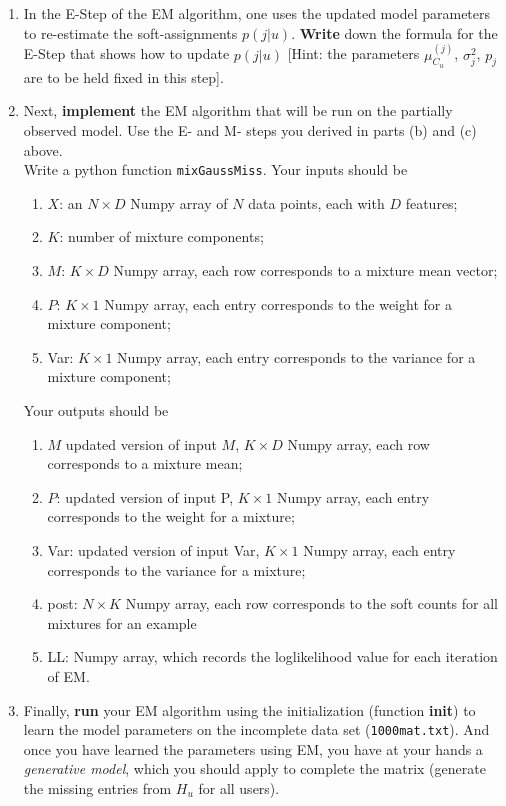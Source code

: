 \begin{enumerate}
\begin{enumerate}
\begin{enumerate}

\end{enumerate}

\item In the E-Step of the EM algorithm, one uses the updated model parameters to re-estimate  the soft-assignments $p(j|u)$. \textbf{Write} down the formula for the E-Step that shows how to update $p(j|u)$ [Hint: the parameters $\mu^{(j)}_{C_u}$, $\sigma^2_j$, $p_j$ are to be held fixed in this step].

\item Next, \textbf{implement} the EM algorithm that will be run on the partially observed model. Use the E- and M- steps you derived in parts (b) and (c) above.\\
    Write a python function \texttt{mixGaussMiss}. Your inputs should be
    \begin{enumerate}
    \item $X$: an $N \times D$ Numpy array of $N$ data points, each with $D$ features;
    \item $K$: number of mixture components;
    \item $M$: $K \times D$ Numpy array, each row corresponds to a mixture mean vector;
    \item $P$: $K \times 1$ Numpy array, each entry corresponds to the weight for a mixture component;
    \item Var: $K \times 1$ Numpy array, each entry corresponds to the variance for a mixture component;
    \end{enumerate}
    Your outputs should be
    \begin{enumerate}
    \item $M$ updated version of input $M$, $K \times D$ Numpy array, each row corresponds to a mixture mean;
    \item $P$: updated version of input P, $K \times 1$ Numpy array, each entry corresponds to the weight for a mixture;
    \item Var: updated version of input Var, $K \times 1$ Numpy array, each entry corresponds to the variance for a mixture;
    \item post: $N \times K$ Numpy array, each row corresponds to the soft counts for all mixtures for an example
    \item LL: Numpy array, which records the loglikelihood value for each iteration of EM.
    \end{enumerate}
\item Finally, \textbf{run} your EM algorithm using the initialization (function \textbf{init}) to learn the model parameters on the incomplete data set (\texttt{1000mat.txt}). And once you have learned the parameters using EM, you have at your hands a \emph{generative model}, which you should apply to complete the matrix (generate the missing entries from $H_u$ for all users).


\end{enumerate}
\end{enumerate}
